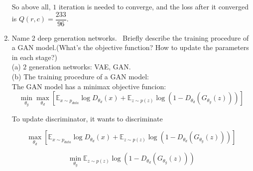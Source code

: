 \documentclass[10pt]{article}
\begin{document}
\begin{enumerate}[1.]
So above all, $1$ iteration is needed to converge, and the loss after it converged is $Q(r,c)=\dfrac{233}{96}$.\\		 
		 
		\newpage


	\item {} Name 2 deep generation networks.~ Briefly describe the training procedure of a GAN model.(What's the objective function? How to update the parameters in each stage?)~\\
(a) $2$ generation networks: VAE, GAN.\\

(b) The training procedure of a GAN model:\\
The GAN model has a minimax objective funcion:
$$\min_{\theta_g}\max_{\theta_d}\left[\mathbb{E}_{x\sim p_{data}}\log D_{\theta_d}(x)+\mathbb{E}_{z\sim p(z)}\log (1-D_{\theta_d}(G_{\theta_{g}}(z)))\right]$$
	
To update discriminator, it wants to discriminate

$$\max_{\theta_d}\left[\mathbb{E}_{x\sim p_{data}}\log D_{\theta_d}(x)+\mathbb{E}_{z\sim p(z)}\log (1-D_{\theta_d}(G_{\theta_{g}}(z)))\right]$$


$$\min_{\theta_g}\mathbb{E}_{z\sim p(z)}\log (1-D_{\theta_d}(G_{\theta_{g}}(z)))$$



\end{enumerate}
\end{document}
